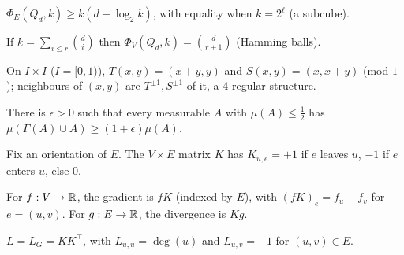 \begin{theorem}
  \label{thm:cube-edge-iso}
  \notready
  $\Phi_E(Q_d,k)\ge k(d-\log_2k)$, with equality when $k=2^\ell$ (a subcube).
\end{theorem}

\begin{theorem}
  \label{thm:cube-vertex-iso}
  \notready
  If $k=\sum_{i\le r}\binom di$ then $\Phi_V(Q_d,k)=\binom d{r+1}$ (Hamming
  balls).
\end{theorem}

\begin{construction}
  \label{constr:margulis-infinite}
  On $I\times I$ ($I=[0,1)$), $T(x,y)=(x+y,y)$ and $S(x,y)=(x,x+y)$ (mod $1$);
  neighbours of $(x,y)$ are $T^{\pm1},S^{\pm1}$ of it, a $4$-regular structure.
\end{construction}

\begin{theorem}
  \label{thm:margulis-torus}
  \notready
  There is $\epsilon>0$ such that every measurable $A$ with $\mu(A)\le\tfrac12$
  has $\mu(\Gamma(A)\cup A)\ge(1+\epsilon)\mu(A)$.
\end{theorem}

\begin{definition}
  \label{def:incidence}
  Fix an orientation of $E$. The $V\times E$ matrix $K$ has $K_{u,e}=+1$ if $e$
  leaves $u$, $-1$ if $e$ enters $u$, else $0$.
\end{definition}

\begin{definition}
  \label{def:gradient}
  For $f:V\to\mathbb{R}$, the gradient is $fK$ (indexed by $E$), with $(fK)_e=f_u-f_v$
  for $e=(u,v)$. For $g:E\to\mathbb{R}$, the divergence is $Kg$.
\end{definition}

\begin{definition}
  \label{def:laplacian}
  $L=L_G=KK^\top$, with $L_{u,u}=\deg(u)$ and $L_{u,v}=-1$ for $(u,v)\in E$.
\end{definition}

